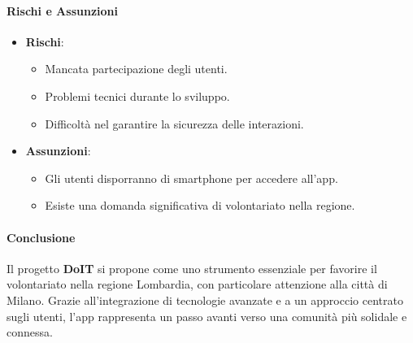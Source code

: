 \paragraph{Rischi e Assunzioni}
\begin{itemize}
\item \textbf{Rischi}:
    \begin{itemize}
    \item Mancata partecipazione degli utenti.
    \item Problemi tecnici durante lo sviluppo.
    \item Difficoltà nel garantire la sicurezza delle interazioni.
    \end{itemize}
\item \textbf{Assunzioni}:
    \begin{itemize}
    \item Gli utenti disporranno di smartphone per accedere all'app.
    \item Esiste una domanda significativa di volontariato nella regione.
    \end{itemize}
\end{itemize}

\paragraph{Conclusione}
Il progetto \textbf{DoIT} si propone come uno strumento essenziale per favorire il volontariato nella regione Lombardia, con particolare attenzione alla città di Milano. Grazie all'integrazione di tecnologie avanzate e a un approccio centrato sugli utenti, l'app rappresenta un passo avanti verso una comunità più solidale e connessa.
